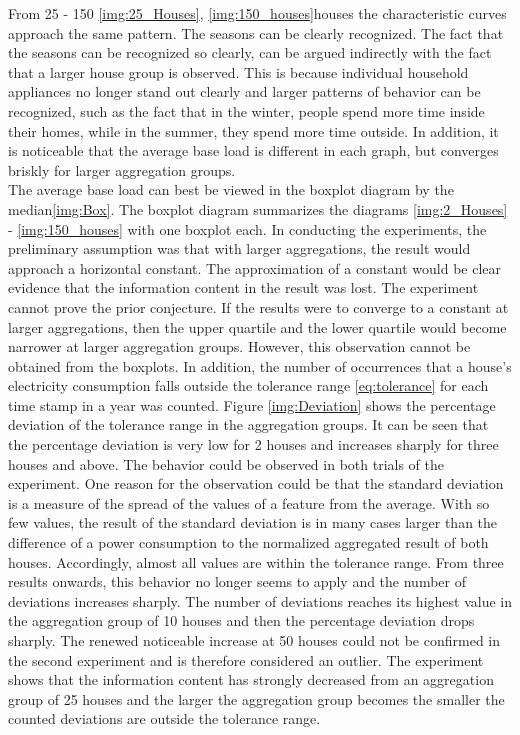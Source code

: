 From 25 - 150 \ref{img:25_Houses}, \ref{img:150_houses}houses the characteristic curves approach the same pattern. The seasons can be clearly recognized. The fact that the seasons can be recognized so clearly, can be argued indirectly with the fact that a larger house group is observed. This is because individual household appliances no longer stand out clearly and larger patterns of behavior can be recognized, such as the fact that in the winter, people spend more time inside their homes, while in the summer, they spend more time outside. In addition, it is noticeable that the average base load is different in each graph, but converges briskly for larger aggregation groups. \\
The average base load can best be viewed in the boxplot diagram by the median\ref{img:Box}. The boxplot diagram summarizes the diagrams \ref{img:2_Houses} - \ref{img:150_houses} with one boxplot each. In conducting the experiments, the preliminary assumption was that with larger aggregations, the result would approach a horizontal constant. The approximation of a constant would be clear evidence that the information content in the result was lost. The experiment cannot prove the prior conjecture. If the results were to converge to a constant at larger aggregations, then the upper quartile and the lower quartile would become narrower at larger aggregation groups. However, this observation cannot be obtained from the boxplots. 
In addition, the number of occurrences that a house's electricity consumption falls outside the tolerance range \ref{eq:tolerance} for each time stamp in a year was counted. Figure \ref{img:Deviation} shows the percentage deviation of the tolerance range in the aggregation groups. It can be seen that the percentage deviation is very low for 2 houses and increases sharply for three houses and above. The behavior could be observed in both trials of the experiment. One reason for the observation could be that the standard deviation is a measure of the spread of the values of a feature from the average. With so few values, the result of the standard deviation is in many cases larger than the difference of a power consumption to the normalized aggregated result of both houses. Accordingly, almost all values are within the tolerance range. From three results onwards, this behavior no longer seems to apply and the number of deviations increases sharply. The number of deviations reaches its highest value in the aggregation group of 10 houses and then the percentage deviation drops sharply. The renewed noticeable increase at 50 houses could not be confirmed in the second experiment and is therefore considered an outlier. The experiment shows that the information content has strongly decreased from an aggregation group of 25 houses and the larger the aggregation group becomes the smaller the counted deviations are outside the tolerance range.
